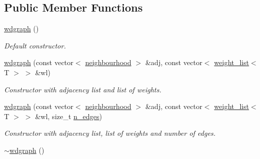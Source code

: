 \subsection*{Public Member Functions}
\begin{DoxyCompactItemize}
\item 
\hypertarget{classlgraph_1_1utils_1_1wdgraph_a5b2ab9227ed3ea23596eebb4b4f397cb}{\hyperlink{classlgraph_1_1utils_1_1wdgraph_a5b2ab9227ed3ea23596eebb4b4f397cb}{wdgraph} ()}\label{classlgraph_1_1utils_1_1wdgraph_a5b2ab9227ed3ea23596eebb4b4f397cb}

\begin{DoxyCompactList}\small\item\em Default constructor. \end{DoxyCompactList}\item 
\hyperlink{classlgraph_1_1utils_1_1wdgraph_aa4af7af163857c281640c0780e5122a4}{wdgraph} (const vector$<$ \hyperlink{namespacelgraph_1_1utils_a0f2ef47028a466d26841709e705390ac}{neighbourhood} $>$ \&adj, const vector$<$ \hyperlink{namespacelgraph_1_1utils_a11e7963f3637ea13778b8d3e69d2c17f}{weight\-\_\-list}$<$ T $>$ $>$ \&wl)
\begin{DoxyCompactList}\small\item\em Constructor with adjacency list and list of weights. \end{DoxyCompactList}\item 
\hyperlink{classlgraph_1_1utils_1_1wdgraph_a6f71fd55d16900a657aeb161114eccd7}{wdgraph} (const vector$<$ \hyperlink{namespacelgraph_1_1utils_a0f2ef47028a466d26841709e705390ac}{neighbourhood} $>$ \&adj, const vector$<$ \hyperlink{namespacelgraph_1_1utils_a11e7963f3637ea13778b8d3e69d2c17f}{weight\-\_\-list}$<$ T $>$ $>$ \&wl, size\-\_\-t \hyperlink{classlgraph_1_1utils_1_1xxgraph_af3f7c3835406c2cbf70479ae1c0253c9}{n\-\_\-edges})
\begin{DoxyCompactList}\small\item\em Constructor with adjacency list, list of weights and number of edges. \end{DoxyCompactList}\item 
\hypertarget{classlgraph_1_1utils_1_1wdgraph_ad5d7319df97007af7f2d6d3bc994c679}{\hyperlink{classlgraph_1_1utils_1_1wdgraph_ad5d7319df97007af7f2d6d3bc994c679}{$\sim$wdgraph} ()}\label{classlgraph_1_1utils_1_1wdgraph_ad5d7319df97007af7f2d6d3bc994c679}


\end{DoxyCompactItemize}
